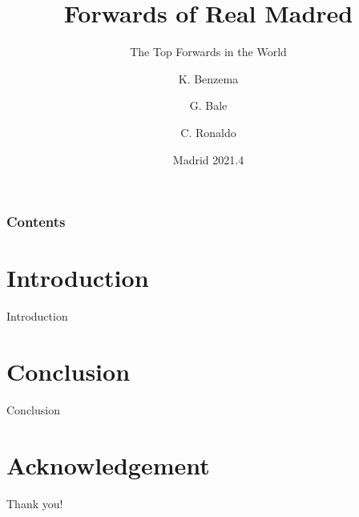 \documentclass[10pt]{beamer}
\title[Nankai University]{Forwards of Real Madred}
\subtitle{The Top Forwards in the World}
\author[K. Benzema]{K. Benzema \and G. Bale  \and C. Ronaldo}
\institute[idk@rma.com]{ Nankai University

School of Soccer}
\date[Madrid 2022.4]
{Madrid 2021.4}
\begin{document}
\frame{\titlepage}
\begin{frame}
\frametitle{Contents}
\tableofcontents
\end{frame}
\section{Introduction}
    \begin{frame}{Introduction}
    \end{frame}


\section{Conclusion}
    \begin{frame}{Conclusion}
    \end{frame}



\section*{Acknowledgement}  
\begin{frame}
\textcolor{myNewColorA}{\Huge{\centerline{Thank you!}}}
\end{frame}
\end{document}
